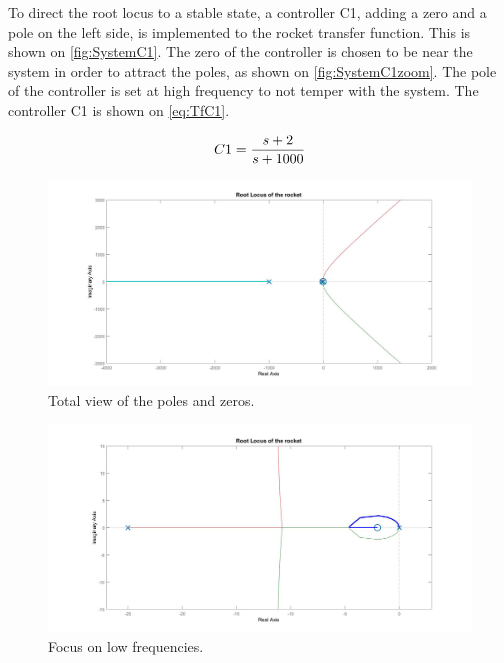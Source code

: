 To direct the root locus to a stable state, a controller C1, adding a zero and a pole on the left side, is implemented to the rocket transfer function. This is shown on \autoref{fig:SystemC1}. The zero of the controller is chosen to be near the system in order to attract the poles, as shown on \autoref{fig:SystemC1zoom}. The pole of the controller is set at high frequency to not temper with the system. The controller C1 is shown on \autoref{eq:TfC1}.

\begin{equation}
		C1 = \frac{s + 2}{s + 1000}	\\
		\label{eq:TfC1}
\end{equation}


\begin{figure}[htbp]
	\centering
	
	\includegraphics[width=\textwidth]{figures/Rocket/design/tf_with_controllerC1}
	\caption{Total view of the poles and zeros.}
	\label{fig:SystemC1}
	
\end{figure}

\begin{figure}[htbp]
	\centering
	
	\includegraphics[width=\textwidth]{figures/Rocket/design/tf_with_controllerC1_zoom}
	\caption{Focus on low frequencies.}
	\label{fig:SystemC1zoom}
	
\end{figure}

